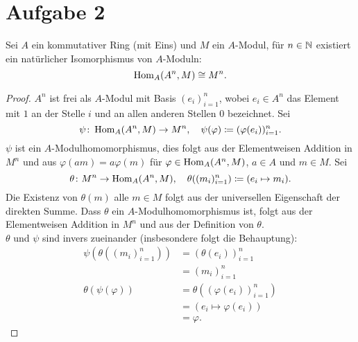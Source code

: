 \documentclass{nico_zettelsose21}
\begin{document}
\section*{Aufgabe 2}
\begin{lemma*}
    Sei $A$ ein kommutativer Ring (mit Eins) und $M$ ein $A$-Modul, für $n \in \mathbb{N}$ existiert ein natürlicher Isomorphismus von $A$-Moduln:
    \[
        \operatorname{Hom}_{A}(A^{n},M) \cong M^{n}.
    \]
\end{lemma*}
\begin{proof}
    $A^{n}$ ist frei als $A$-Modul mit Basis $(e_{i})_{i = 1}^{n}$, wobei $e_{i} \in A^{n}$ das Element mit $1$ an der Stelle $i$ und
    an allen anderen Stellen $0$ bezeichnet. Sei
    \[
       \psi \colon \operatorname{Hom}_{A}(A^{n},M) \to M^{n}, \ \ \  \psi(\varphi) \coloneqq (\varphi(e_{i}))_{i=1}^{n}.
    \]
    $\psi$ ist ein $A$-Modulhomomorphismus, dies folgt aus der Elementweisen Addition in $M^{n}$ und aus $\varphi(am) = a\varphi(m)$ 
    für $\varphi \in \operatorname{Hom}_{A}(A^{n},M)$, $a \in A$ und $m \in M$. Sei 
    \[
        \theta\colon M^{n} \to \operatorname{Hom}_{A}(A^{n},M), \ \ \ \theta((m_{i})_{i=1}^{n}) \coloneqq (e_{i} \mapsto m_{i}).
    \]
    Die Existenz von $\theta(m)$ alle $m \in M$ folgt aus der universellen Eigenschaft der direkten Summe. Dass $\theta$
    ein $A$-Modulhomomorphismus ist, folgt aus der Elementweisen Addition in $M^{n}$ und aus der Definition von $\theta$. \\
    $\theta$ und $\psi$ sind invers zueinander (insbesondere folgt die Behauptung):
    \begin{align*}
        \psi(\theta((m_{i})_{i=1}^{n})) &= (\theta(e_{i}))_{i=1}^{n} \\
        &= (m_{i})_{i=1}^{n} \\
        \theta(\psi(\varphi)) &= \theta((\varphi(e_{i}))_{i=1}^{n}) \\
        &= (e_{i} \mapsto \varphi(e_{i})) \\
        &= \varphi.
    \end{align*}
\end{proof}
\end{document}
